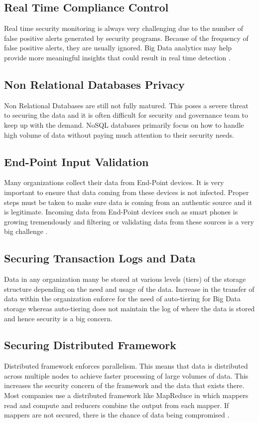 \documentclass[sigconf]{acmart}
\begin{document}
\subsection{Real Time Compliance Control}
Real time security monitoring is always very challenging due to the number of false positive alerts generated by security programs.  Because of the frequency of false positive alerts, they are usually ignored. Big Data analytics may help provide more meaningful insights that could result in real time detection . 

\subsection{Non Relational Databases Privacy}
Non Relational Databases are still not fully matured.  This poses a severe threat to securing the data and it is often difficult for security and governance team to keep up with the demand. NoSQL databases primarily focus on how to handle high volume of data without paying much attention to their security needs. 

\subsection{End-Point Input Validation}
Many organizations collect their data from End-Point devices. It is very important to ensure that data coming from these devices is not infected. Proper steps must be taken to make sure data is coming from an authentic source and it is legitimate. Incoming data from End-Point devices such as smart phones is growing tremendously and filtering or validating data from these sources is a very big challenge \cite{csasecurity}. 

\subsection{Securing Transaction Logs and Data}
Data in any organization many be stored at various levels (tiers) of the storage structure depending on the need and usage of the data. Increase in the transfer of data within the organization enforce for the need of auto-tiering for Big Data storage whereas auto-tiering does not maintain the log of where the data is stored and hence security is a big concern.

\subsection{Securing Distributed Framework}
Distributed framework enforces parallelism. This means that data is distributed across multiple nodes to achieve faster processing of large volumes of data. This increases the security concern of the framework and the data that exists there. Most companies use a distributed framework like MapReduce in which mappers read and compute and reducers combine the output from each mapper. If mappers are not secured, there is the chance of data being compromised \cite{dataconomy}.
\end{document}
